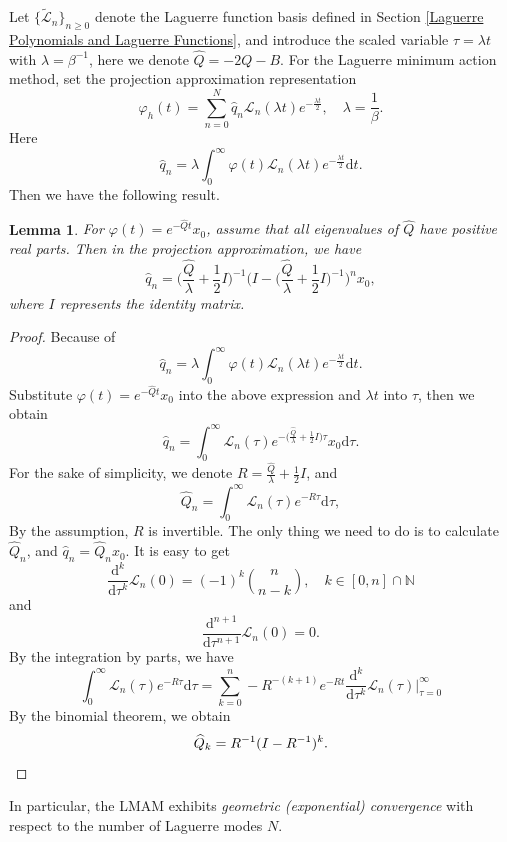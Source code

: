 \documentclass[a4paper,fleqn, 12pt]{cas-sc}
\newtheorem{lemma}{Lemma}
\newcommand{\mathd}{\mathrm{d}}
\newcommand{\LaP}{{\mathscr{L}}}
\numberwithin{table}{section}
\begin{document}
Let $\{\widetilde \LaP_n\}_{n\ge0}$ denote the Laguerre function basis defined in Section \ref{Laguerre Polynomials and Laguerre Functions}, and introduce
the scaled variable $\tau = \lambda t$ with $\lambda = \beta^{-1}$,
here we denote $\widehat{Q} = - 2 Q - B.$ For the Laguerre minimum action
method, set the projection approximation representation
\[ \varphi_h (t) = \sum_{n = 0}^N \widehat{q}_n \LaP_n (\lambda t) {e^{-
		\frac{\lambda t}{2}}} , \quad \lambda = \frac{1}{\beta} . \]
Here
\[  \widehat{q}_n = \lambda \int^{\infty}_0 \varphi (t) \LaP_n (\lambda t) {e^{-
		\frac{\lambda t}{2}}}  \mathd t. \]
Then we have the following result.
\begin{lemma}
	For $\varphi(t)=e^{-\widehat{Q}t}x_0$, assume that all eigenvalues of $\widehat{Q}$ have positive real parts. Then in the projection approximation, we have
	\[  \widehat{q }_n = \bigl( \frac{\hat{Q}}{\lambda} + \frac{1}{2} I
	\bigr)^{- 1} \bigl( I - \bigl( \frac{\hat{Q}}{\lambda} + \frac{1}{2} I
	\bigr)^{- 1} \bigr)^n x_0, \]
	where $I$ represents the identity matrix.
\end{lemma}

\begin{proof}
	Because of
	\[ \widehat{q }_n = \lambda \int^{\infty}_0 \varphi (t) \LaP_n (\lambda t)
	{e^{- \frac{\lambda t}{2}}}  \mathd t. \]
	Substitute $\varphi(t)=e^{-\widehat{Q}t}x_0$ into the above expression and $\lambda t$ into
	$\tau$, then we obtain
	\[ \widehat{q }_n = \int^{\infty}_0 \LaP_n (\tau) {e^{- \bigl(
			\frac{\hat{Q}}{\lambda} + \frac{1}{2} I \bigr) \tau}}  x_0 \mathd \tau .
	\]
	For the sake of simplicity, we denote $R = \frac{\hat{Q}}{\lambda} +
	\frac{1}{2} I$, and
	\[ \widehat{Q }_n = \int^{\infty}_0 \LaP_n (\tau) {e^{- R \tau}}  \mathd \tau,
	\]
	By the assumption, $R$ is invertible. The only thing we need to do is to
	calculate $\widehat{Q }_n$, and $\widehat{q }_n = \widehat{Q }_n x_0$. It is
	easy to get
	\[ \frac{\mathd^k}{\mathd \tau^k } \LaP_n (0) = (- 1)^k \binom{n}{n-k}, \quad k \in [0, n] \cap \mathbb{N} \]
	and
	\[ \frac{\mathd^{n + 1}}{\mathd \tau^{n + 1} } \LaP_n (0) = 0. \]
	By the integration by parts, we have
	\[ \int^{\infty}_0 \LaP_n (\tau) {e^{- R \tau}}  \mathd \tau = \sum_{k = 0}^n -
	R^{- (k + 1)} e^{- R t}  \frac{\mathd^k}{\mathd
		\tau^k } \LaP_n (\tau) \Big|_{\tau = 0}^{\infty}
	\]
	By the binomial theorem, we obtain
	\[ \widehat{Q}_k = R^{- 1} (I - R^{- 1})^k. \qedhere \] 
\end{proof}

In particular, the LMAM exhibits \emph{geometric (exponential) convergence} with respect to
the number of Laguerre modes $N$.
\end{document}
